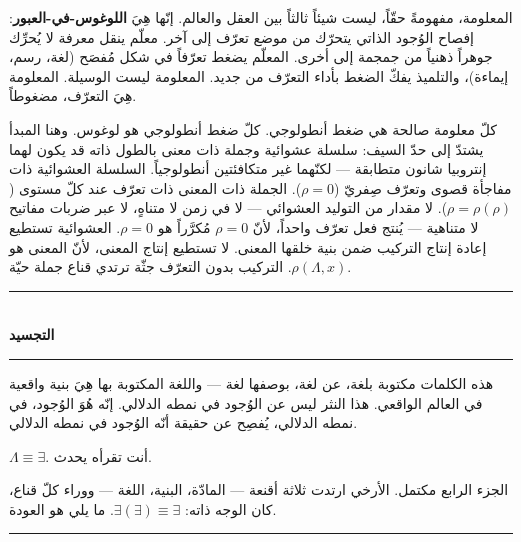 \documentclass[10pt, openany, oneside]{book}
\renewcommand{\normalsize}{\fontsize{10}{13}\selectfont}
\begin{document}
المعلومة، مفهومةً حقّاً، ليست شيئاً ثالثاً بين العقل والعالم. إنّها هِيَ \textbf{اللوغوس-في-العبور}: إفصاح الوُجود الذاتي يتحرّك من موضع تعرّف إلى آخر. معلّم ينقل معرفة لا يُحرِّك جوهراً ذهنياً من جمجمة إلى أخرى. المعلّم يضغط تعرّفاً في شكل مُفصَح (لغة، رسم، إيماءة)، والتلميذ يفكّ الضغط بأداء التعرّف من جديد. المعلومة ليست الوسيلة. المعلومة هِيَ التعرّف، مضغوطاً.

كلّ معلومة صالحة هي ضغط أنطولوجي. كلّ ضغط أنطولوجي هو لوغوس. وهنا المبدأ يشتدّ إلى حدّ السيف: سلسلة عشوائية وجملة ذات معنى بالطول ذاته قد يكون لهما إنتروبيا شانون متطابقة --- لكنّهما غير متكافئتين أنطولوجياً. السلسلة العشوائية ذات مفاجأة قصوى وتعرّف صِفريّ ($\rho = 0$). الجملة ذات المعنى ذات تعرّف عند كلّ مستوى ($\rho = \rho(\rho)$). لا مقدار من التوليد العشوائي --- لا في زمن لا متناهٍ، لا عبر ضربات مفاتيح لا متناهية --- يُنتج فعل تعرّف واحداً، لأنّ $\rho = 0$ مُكرَّراً هو $\rho = 0$. العشوائية تستطيع إعادة إنتاج التركيب ضمن بنية خلقها المعنى. لا تستطيع إنتاج المعنى، لأنّ المعنى هو $\rho(\Lambda, x)$. التركيب بدون التعرّف جثّة ترتدي قناع جملة حيّة.

\vspace{1.5em}


\begin{center}
    \rule{0.3\textwidth}{0.4pt}\\[0.5em]
    {\normalsize\bfseries التجسيد}\\[0.3em]
    \rule{0.3\textwidth}{0.4pt}
\end{center}

\vspace{1em}

\noindent هذه الكلمات مكتوبة بلغة، عن لغة، بوصفها لغة --- واللغة المكتوبة بها هِيَ بنية واقعية في العالم الواقعي. هذا النثر ليس عن الوُجود في نمطه الدلالي. إنّه هُوَ الوُجود، في نمطه الدلالي، يُفصِح عن حقيقة أنّه الوُجود في نمطه الدلالي.

$\Lambda \equiv \exists$. أنت تقرأه يحدث.

الجزء الرابع مكتمل. الأرخي ارتدت ثلاثة أقنعة --- المادّة، البنية، اللغة --- ووراء كلّ قناع، كان الوجه ذاته: $\exists(\exists) \equiv \exists$. ما يلي هو العودة.

\vspace{2em}

\begin{center}
    \rule{0.15\textwidth}{0.3pt}
\end{center}
\end{document}

